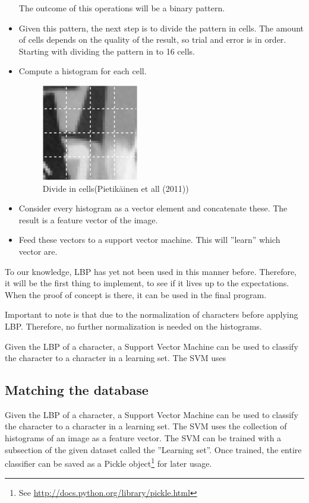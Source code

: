 \documentclass[a4paper]{article}
\begin{document}
\begin{itemize}
The outcome of this operations will be a binary pattern.

\item Given this pattern, the next step is to divide the pattern in cells. The
amount of cells depends on the quality of the result, so trial and error is in order.
Starting with dividing the pattern in to 16 cells. 

\item Compute a histogram for each cell.

\begin{figure}[h!]
\center
\includegraphics[scale=0.7]{cells.png}
\caption{Divide in cells(Pietik\"ainen et all (2011))}
\end{figure}

\item Consider every histogram as a vector element and concatenate these. The result is a
feature vector of the image.

\item Feed these vectors to a support vector machine. This will ''learn'' which vector
are. 

\end{itemize}

To our knowledge, LBP has yet not been used in this manner before. Therefore,
it will be the first thing to implement, to see if it lives up to the
expectations. When the proof of concept is there, it can be used in the final
program.

Important to note is that due to the normalization of characters before
applying LBP. Therefore, no further normalization is needed on the histograms.

Given the LBP of a character, a Support Vector Machine can be used to classify
the character to a character in a learning set. The SVM uses

\subsection{Matching the database}

Given the LBP of a character, a Support Vector Machine can be used to classify
the character to a character in a learning set. The SVM uses the collection of
histograms of an image as a feature vector.  The SVM can be trained with a
subsection of the given dataset called the ''Learning set''. Once trained, the
entire classifier can be saved as a Pickle object\footnote{See
\url{http://docs.python.org/library/pickle.html}} for later usage.
\end{document}
